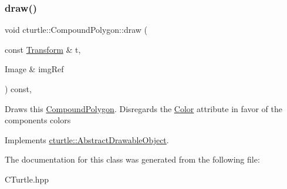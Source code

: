 \subsubsection{\texorpdfstring{draw()}{draw()}}
{\footnotesize\ttfamily void cturtle\+::\+Compound\+Polygon\+::draw (\begin{DoxyParamCaption}\item[{const \hyperlink{classcturtle_1_1Transform}{Transform} \&}]{t,  }\item[{Image \&}]{img\+Ref }\end{DoxyParamCaption}) const\hspace{0.3cm}{\ttfamily [inline]}, {\ttfamily [virtual]}}

Draws this \hyperlink{classcturtle_1_1CompoundPolygon}{Compound\+Polygon}. Disregards the \hyperlink{classcturtle_1_1Color}{Color} attribute in favor of the components\textquotesingle{} colors 

Implements \hyperlink{classcturtle_1_1AbstractDrawableObject_a7b1ad1e9743d343e0fe577de3978bdad}{cturtle\+::\+Abstract\+Drawable\+Object}.



The documentation for this class was generated from the following file\+:\begin{DoxyCompactItemize}
\item 
C\+Turtle.\+hpp\end{DoxyCompactItemize}
